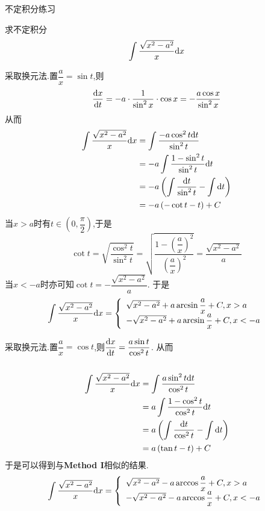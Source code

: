 \documentclass{ctexart}
\begin{document}
\pagestyle{empty}
\begin{center}\large
    不定积分练习
\end{center}
\begin{problem}[Problem 1.]
    求不定积分$$\int{\dfrac{\sqrt{x^2-a^2}}{x}}\mathrm{d} x$$
\end{problem}
\begin{solution}
    采取换元法.置$\dfrac{a}{x}=\sin t$,则
    $$\dfrac{\mathrm{d} x}{\mathrm{d} t}=-a\cdot\dfrac{1}{\sin^2x}\cdot\cos x=-\dfrac{a\cos x}{\sin^2x}$$
    从而
    $$\begin{aligned}
        \int{\dfrac{\sqrt{x^2-a^2}}{x}\mathrm{d}x}
        &= \int{\dfrac{-a\cos^2t\mathrm{d}t}{\sin^2 t}} \\
        &= -a\int\dfrac{1-\sin^2t}{\sin^2t}\mathrm{d} t \\
        &= -a\left(\int{\dfrac{\mathrm{d}t}{\sin^2t}}-\int\mathrm{d} t\right) \\
        &= -a\left(-\cot t-t\right)+C
    \end{aligned}$$
    当$x>a$时有$t\in\left(0,\dfrac{\pi}{2}\right)$,于是
    $$\cot t=\sqrt{\dfrac{\cos^2t}{\sin^2t}}=\sqrt{\dfrac{1-\left(\dfrac{a}{x}\right)^2}{\left(\dfrac{a}{x}\right)^2}}=\dfrac{\sqrt{x^2-a^2}}{a}$$
    当$x<-a$时亦可知$\cot t=-\dfrac{\sqrt{x^2-a^2}}{a}$.
    于是
    $$
    \int{\dfrac{\sqrt{x^2-a^2}}{x}\mathrm{d}x}=
        \left\{\begin{array}{l}
            \sqrt{x^2-a^2}+a\arcsin\dfrac{a}{x}+C,x>a \\
            -\sqrt{x^2-a^2}+a\arcsin\dfrac{a}{x}+C,x<-a \\
        \end{array}\right.
    $$
\end{solution}
\begin{solution}
    采取换元法.置$\dfrac{a}{x}=\cos t$,则$\displaystyle\dfrac{\mathrm{d} x}{\mathrm{d} t}=\dfrac{a\sin t}{\cos^2t}$.
    从而\\\ \\
    $$\begin{aligned}
        \int{\dfrac{\sqrt{x^2-a^2}}{x}\mathrm{d}x}
        &= \int{\dfrac{a\sin^2t\mathrm{d}t}{\cos^2t}} \\
        &= a\int{\dfrac{1-\cos^2t}{\cos^2t}\mathrm{d}t} \\
        &= a\left(\int{\dfrac{\mathrm{d}t}{\cos^2t}}-\int{\mathrm{d}t}\right) \\
        &= a\left(\tan t-t\right)+C
    \end{aligned}$$
    于是可以得到与\textbf{Method I}相似的结果.
    $$
    \int{\dfrac{\sqrt{x^2-a^2}}{x}\mathrm{d}x}=
        \left\{\begin{array}{l}
            \sqrt{x^2-a^2}-a\arccos\dfrac{a}{x}+C,x>a \\
            -\sqrt{x^2-a^2}-a\arccos\dfrac{a}{x}+C,x<-a \\
        \end{array}\right.
    $$
\end{solution}
\end{document}

